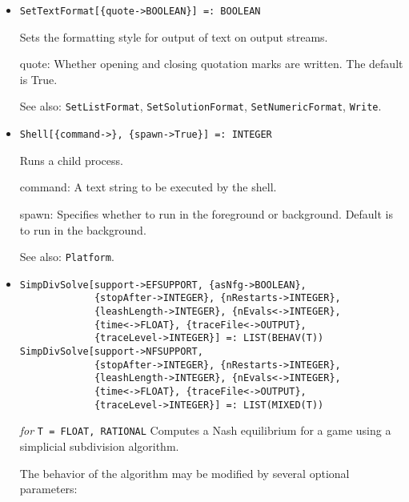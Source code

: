 \begin{itemize}
\item{}
\protect \large \begin{verbatim}
SetTextFormat[{quote->BOOLEAN}] =: BOOLEAN
\end{verbatim}\normalsize

\bd
Sets the formatting style for output of text on output streams.
\bd
\item [quote:] Whether opening and closing quotation marks are
written.  The default is True.  
\ed
\item [See also:] \verb+SetListFormat+, \verb+SetSolutionFormat+, 
\verb+SetNumericFormat+, \verb+Write+.
\ed

\item{}
\protect \large \begin{verbatim}
Shell[{command->}, {spawn->True}] =: INTEGER
\end{verbatim} \normalsize

\bd
Runs a child process.  
\bd
\item [command:] A text string to be executed by the shell.  
\item [spawn:] Specifies whether to run in the foreground or
background.  Default is to run in the background.  
\ed
\item [See also:] \verb+Platform+.
\ed

\item{}
\protect \large \begin{verbatim}
SimpDivSolve[support->EFSUPPORT, {asNfg->BOOLEAN}, 
             {stopAfter->INTEGER}, {nRestarts->INTEGER}, 
             {leashLength->INTEGER}, {nEvals<->INTEGER}, 
             {time<->FLOAT}, {traceFile<->OUTPUT},
             {traceLevel->INTEGER}] =: LIST(BEHAV(T))
SimpDivSolve[support->NFSUPPORT, 
             {stopAfter->INTEGER}, {nRestarts->INTEGER}, 
             {leashLength->INTEGER}, {nEvals<->INTEGER}, 
             {time<->FLOAT}, {traceFile<->OUTPUT},
             {traceLevel->INTEGER}] =: LIST(MIXED(T))
\end{verbatim}\normalsize

{\it for} {\tt T = FLOAT, RATIONAL}
\bd
Computes a Nash equilibrium for a game using a simplicial subdivision
algorithm. 

The behavior of the algorithm may be modified by several optional
parameters:


\end{itemize}
